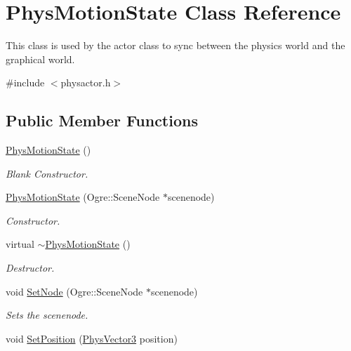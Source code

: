 \hypertarget{classPhysMotionState}{
\section{PhysMotionState Class Reference}
\label{d2/d14/classPhysMotionState}
}


This class is used by the actor class to sync between the physics world and the graphical world.  




{\ttfamily \#include $<$physactor.h$>$}

\subsection*{Public Member Functions}
\begin{DoxyCompactItemize}
\item 
\hyperlink{classPhysMotionState_a8439c3835b9d96b0b1b285126df41a42}{PhysMotionState} ()
\begin{DoxyCompactList}\small\item\em Blank Constructor. \item\end{DoxyCompactList}\item 
\hyperlink{classPhysMotionState_a9c315b85bc405a36a6bd9d9a9f68c34a}{PhysMotionState} (Ogre::SceneNode $\ast$scenenode)
\begin{DoxyCompactList}\small\item\em Constructor. \item\end{DoxyCompactList}\item 
virtual \hyperlink{classPhysMotionState_a74441aa0ba9a1b99ee1662b2eee9db3c}{$\sim$PhysMotionState} ()
\begin{DoxyCompactList}\small\item\em Destructor. \item\end{DoxyCompactList}\item 
void \hyperlink{classPhysMotionState_a4ba21f0b58f33197b61cf1a9754027bc}{SetNode} (Ogre::SceneNode $\ast$scenenode)
\begin{DoxyCompactList}\small\item\em Sets the scenenode. \item\end{DoxyCompactList}\item 
void \hyperlink{classPhysMotionState_aa2fa4f107147626cd33d42fd3fbe178b}{SetPosition} (\hyperlink{classPhysVector3}{PhysVector3} position)

\end{DoxyCompactItemize}
